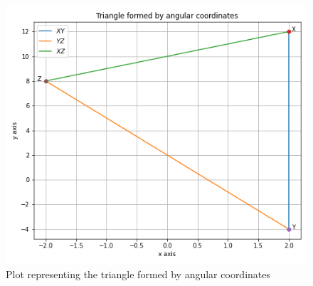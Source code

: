 \documentclass[journal,12pt]{IEEEtran}
\begin{document}
\begin{figure}[h]
	\centering
	\includegraphics[width=\columnwidth]{Triangle_Fig.png}
	\caption{Plot representing the triangle formed by angular coordinates}
	\label{fig2}
\end{figure}
\end{document}
